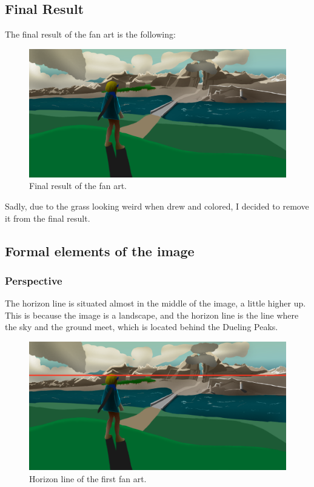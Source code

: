 \documentclass{cup-pan}
\begin{document}
    \subsection{Final Result}
        The final result of the fan art is the following:
        \begin{figure}[H]
            \includegraphics[width=\textwidth]{Imagenes/Fanart1/Color/IIII_Iteracion.png}
            \caption{Final result of the fan art.}
        \end{figure}
        Sadly, due to the grass looking weird when drew and colored, I decided to remove it from the final result.\\

    \subsection{Formal elements of the image}

        \subsubsection{Perspective}

            The horizon line is situated almost in the middle of the image, a little higher up. This is because the image is a landscape, and the horizon line is the line where the sky and the ground meet, which is located behind the Dueling Peaks. \\
            \begin{figure}[H]
                \includegraphics[width=\textwidth]{Imagenes/Fanart1/Analysis/horizonte.png}
                \caption{Horizon line of the first fan art.}
            \end{figure}
\end{document}
